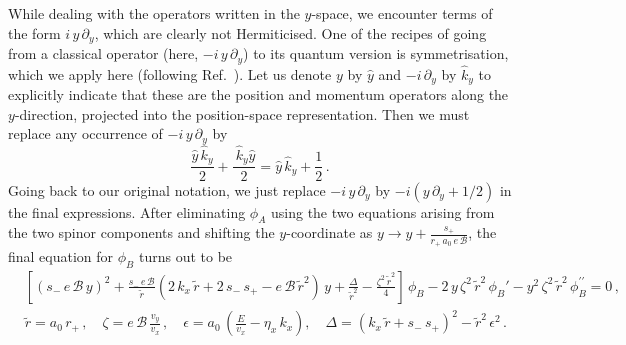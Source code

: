 \documentclass[aps,prb, onecolumn,nofootinbib,citeautoscript,10pt]{revtex4-2}
\def \nn{\nonumber \\}
\begin{document}
While dealing with the operators written in the $y$-space, we encounter terms of the form $i\, y\, \partial_y $, which are clearly not Hermiticised. One of the recipes of going from a classical operator (here, $ -i\, y\, \partial_y$) to its quantum version is symmetrisation, which we apply here (following Ref.~\cite{strained-dirac-franz}). Let us denote $y$ by $\hat y$ and $-i\, \partial_y$ by $\hat k_y$ to explicitly indicate that these are the position and momentum operators along the $y$-direction, projected into the position-space representation. Then we must replace any occurrence of $ -i\, y \,\partial_y $ by
$$ \frac{\hat{y} \,\hat{k}_y}{2}  +   \frac{\ \hat{k}_y \hat{y} }{2} = \hat{y} \,\hat{k}_y + \frac{1}{2} \,.$$
Going back to our original notation, we just replace $ -i\, y \,\partial_y $ by $-i\left ( y\,\partial_y + 1/2 \right)$ in the final expressions. After eliminating $\phi_A$ using the two equations arising from the two spinor components and shifting the $y$-coordinate as $ y\rightarrow y + 
\frac{s_+}{r_+ \,a_0\,  e\, {\mathcal B}}$, the final equation for $\phi_B$ turns out to be
\begin{align}
\label{eqdiffea}
& \left[(s_{-}\,e \, {\mathcal B}\,y)^2 + \frac{s_{-} \,e \, {\mathcal B}}{\tilde{r}}(2\,k_x\,\tilde{r}+2\,s_{-}\,s_+
-e \, {\mathcal B}\,\tilde{r}^2)\,y+\frac{\Delta}{\tilde{r}^2}-\frac{\zeta^2\,\tilde{r}^2}{4} \right] \, \phi_B 
-2 \,y \, \zeta^2 \, \tilde{r}^2 \, \phi_B'-y^2 \, \zeta^2 \, \tilde{r}^2 \, \phi_B^{\prime \prime} = 0\,,
\nn & \tilde{r} = a_0 \, r_+ \,, \quad \zeta =  e \, {\mathcal B} \, \frac{v_y}{v_x} \,, \quad
\epsilon = a_0 \, \left( \frac{E}{v_x}- \eta_x \, k_x \right), \quad
\Delta = (k_x \, \tilde r+ s_{-} \, s_+ )^2-\tilde r^2 \, \epsilon^2 \,.
\end{align}
\end{document}
